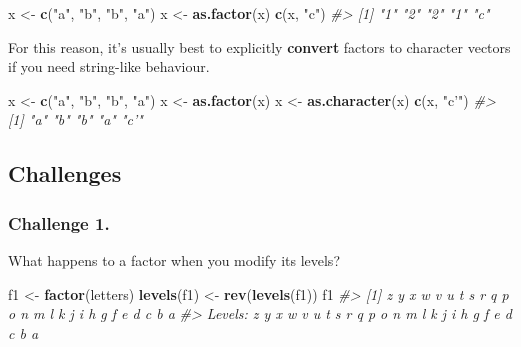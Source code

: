 \documentclass[]{book}
\newenvironment{Shaded}{\begin{snugshade}}{\end{snugshade}}
\newcommand{\KeywordTok}[1]{\textcolor[rgb]{0.13,0.29,0.53}{\textbf{#1}}}
\newcommand{\StringTok}[1]{\textcolor[rgb]{0.31,0.60,0.02}{#1}}
\newcommand{\CommentTok}[1]{\textcolor[rgb]{0.56,0.35,0.01}{\textit{#1}}}
\newcommand{\NormalTok}[1]{#1}
\begin{document}
\begin{Shaded}
\begin{Highlighting}[]
\NormalTok{x <-}\StringTok{ }\KeywordTok{c}\NormalTok{(}\StringTok{"a"}\NormalTok{, }\StringTok{"b"}\NormalTok{, }\StringTok{"b"}\NormalTok{, }\StringTok{"a"}\NormalTok{)}
\NormalTok{x <-}\StringTok{ }\KeywordTok{as.factor}\NormalTok{(x)}
\KeywordTok{c}\NormalTok{(x, }\StringTok{"c"}\NormalTok{)}
\CommentTok{#> [1] "1" "2" "2" "1" "c"}
\end{Highlighting}
\end{Shaded}

For this reason, it's usually best to explicitly \textbf{convert}
factors to character vectors if you need string-like behaviour.

\begin{Shaded}
\begin{Highlighting}[]
\NormalTok{x <-}\StringTok{ }\KeywordTok{c}\NormalTok{(}\StringTok{"a"}\NormalTok{, }\StringTok{"b"}\NormalTok{, }\StringTok{"b"}\NormalTok{, }\StringTok{"a"}\NormalTok{)}
\NormalTok{x <-}\StringTok{ }\KeywordTok{as.factor}\NormalTok{(x)}
\NormalTok{x <-}\StringTok{ }\KeywordTok{as.character}\NormalTok{(x)}
\KeywordTok{c}\NormalTok{(x, }\StringTok{"c'"}\NormalTok{)}
\CommentTok{#> [1] "a"  "b"  "b"  "a"  "c'"}
\end{Highlighting}
\end{Shaded}

\subsection{Challenges}\label{challenges-7}

\subsubsection*{Challenge 1.}\label{challenge-1.-2}

What happens to a factor when you modify its levels?

\begin{Shaded}
\begin{Highlighting}[]
\NormalTok{f1 <-}\StringTok{ }\KeywordTok{factor}\NormalTok{(letters)}
\KeywordTok{levels}\NormalTok{(f1) <-}\StringTok{ }\KeywordTok{rev}\NormalTok{(}\KeywordTok{levels}\NormalTok{(f1))}
\NormalTok{f1}
\CommentTok{#>  [1] z y x w v u t s r q p o n m l k j i h g f e d c b a}
\CommentTok{#> Levels: z y x w v u t s r q p o n m l k j i h g f e d c b a}
\end{Highlighting}
\end{Shaded}
\end{document}
